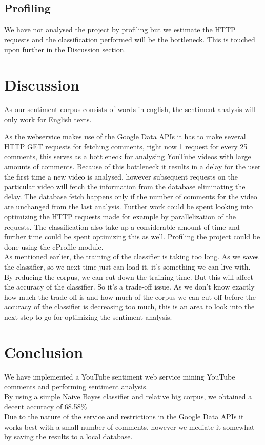 \documentclass[conference]{IEEEtran}
\begin{document}
\subsection{Profiling}

We have not analysed the project by profiling but we estimate the HTTP requests and the classification performed will be the bottleneck. This is touched upon further in the Discussion section.

\section{Discussion}

As our sentiment corpus consists of words in english, the sentiment analysis will only work for English texts.

As the webservice makes use of the Google Data APIs it has to make several HTTP GET requests for fetching comments, right now 1 request for every 25 comments, this serves as a bottleneck for analysing YouTube videos with large amounts of comments. Because of this bottleneck it results in a delay for the user the first time a new video is analysed, however subsequent requests on the particular video will fetch the information from the database eliminating the delay. The database fetch happens only if the number of comments for the video are unchanged from the last analysis. Further work could be spent looking into optimizing the HTTP requests made for example by parallelization of the requests. The classification also take up a considerable amount of time and further time could be spent optimizing this as well. Profiling the project could be done using the cProfile module\cite{cprofile}.\\

As mentioned earlier, the training of the classifier is taking too long. As we saves the classifier, so we next time just can load it, it's something we can live with.  \\ 
By reducing the corpus, we can cut down the training time. But this will affect the accuracy of the classifier. So it's a trade-off issue. As we don't know exactly how much the trade-off is and how much of the corpus we can cut-off before the accuracy of the classifier is decreasing too much, this is an area to look into the next step to go for optimizing the sentiment analysis. 

\section{Conclusion}
We have implemented a YouTube sentiment web service mining YouTube comments and performing sentiment analysis. \\
By using a simple Naive Bayes classifier and relative big corpus, we obtained a decent accuracy of 68.58\%\\
Due to the nature of the service and restrictions in the Google Data APIs it works best with a small number of comments, however we mediate it somewhat by saving the results to a local database.
\end{document}
